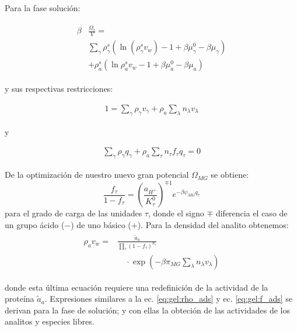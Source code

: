 Para la fase soluci\'on:

\begin{align}
	\begin{aligned}
		\beta&\frac{\Omega_s}{V}=\\& \sum_{\gamma   } {\rho^s_\gamma\left(\ln(\rho_\gamma^sv_w) -1 + \beta\mu_\gamma^0 - \beta\mu_\gamma\right)} \\
		& + \rho^s_a \left( \ln \rho^s_a v_w -1 +\beta\mu^0_a - \beta\mu_a\right)
	\end{aligned}
	\label{eq:gel:bulk-total}
\end{align}

y sus respectivas restricciones:

\begin{align}
	1 = \sum_{\gamma } \rho_\gamma v_\gamma  + \rho_a \sum_\lambda n_\lambda v_\lambda
\end{align}

y 

\begin{align}
	\sum_\gamma \rho_\gamma q_\gamma + \rho_a \sum_\tau n_\tau f_\tau q_\tau = 0
\end{align}



De la optimizaci\'on de nuestro nuevo gran potencial $\Omega_{MG}$  se obtiene:
%
\begin{equation}
\frac{f_\tau}{1-f_\tau}=\left(\frac{a_{H^+}}{K^0_\tau}\right)^{\mp 1} e^{-\beta \psi_{MG} q_\tau}
\label{eq:gel:f_ads}
\end{equation}
%
\noindent para el grado de carga de las unidades $\tau$, donde el signo $\mp$ diferencia el caso de un grupo \'acido ($-$) de uno b\'asico ($+$).
Para la densidad del analito obtenemos:
%
\begin{align}
    \begin{aligned}
   \rho_a v_w =&\frac{ \tilde{a}_a}{\prod_\tau \left(1-f_\tau\right)^{n_\tau}}\\
&\quad \cdot\exp{\left(-\beta \pi_{MG} \sum_\lambda n_\lambda v_\lambda \right)} 
	\label{eq:gel:rho_ads}
    \end{aligned}
\end{align}
%

\noindent donde esta \'ultima ecuaci\'on requiere una redefinici\'on de la actividad de la prote\'ina $\tilde{a}_a$.
Expresiones similares a la ec. \ref{eq:gel:rho_ads} y ec. \ref{eq:gel:f_ads} se derivan para la fase de soluci\'on; y con ellas la obteci\'on de las actividades  de los analitos y especies libres. 



